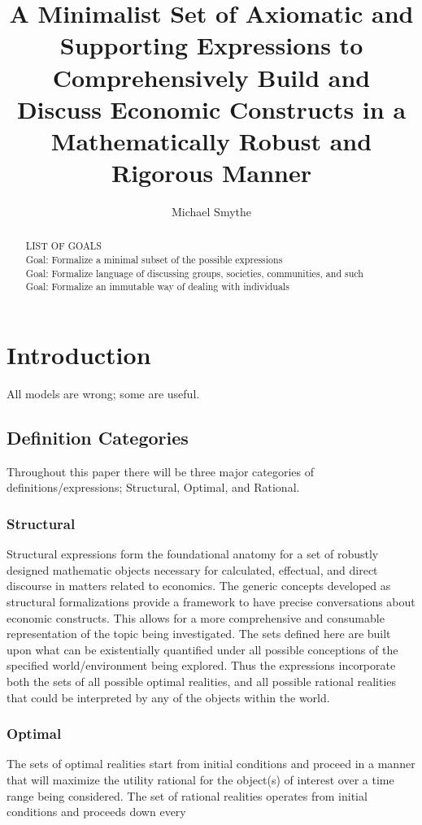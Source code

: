 \documentclass[]{article}
\title{A Minimalist Set of Axiomatic and Supporting Expressions to Comprehensively Build and Discuss Economic Constructs in a Mathematically Robust and Rigorous Manner}
\author{Michael Smythe}
\begin{document}
\maketitle

\begin{abstract}
LIST OF GOALS
\\Goal: Formalize a minimal subset of the possible expressions
\\Goal: Formalize language of discussing groups, societies, communities, and such
\\Goal: Formalize an immutable way of dealing with individuals
\end{abstract}
\section*{Introduction}
All models are wrong; some are useful. 
\subsection*{Definition Categories}
Throughout this paper there will be three major categories of definitions/expressions; Structural, Optimal, and Rational.
%
\subsubsection*{Structural}
Structural expressions form the foundational anatomy for a set of robustly designed mathematic objects necessary for calculated, effectual, and direct discourse in matters related to economics. The generic concepts developed as structural formalizations provide a framework to have precise conversations about economic constructs. This allows for a more comprehensive and consumable representation of the topic being investigated. The sets defined here are built upon what can be existentially quantified under all possible conceptions of the specified world/environment being explored. Thus the expressions incorporate both the sets of all possible optimal realities, and all possible rational realities that could be interpreted by any of the objects within the world.     
%
\subsubsection*{Optimal}
 The sets of optimal realities start from initial conditions and proceed in a manner that will maximize the utility rational for the object(s) of interest over a time range being considered. The set of rational realities operates from initial conditions and proceeds down every
%
\end{document}
